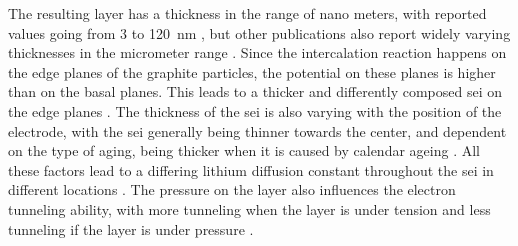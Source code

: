 The resulting layer has a thickness in the range of nano meters, with reported values going from 3 to \SI{120}{\nano\meter} \cite{An.2016,Bhattacharya.2012,Shinagawa.2017,Seidl.2016}, but other publications also report widely varying thicknesses in the micrometer range \cite{Bhattacharya.2012,Balagopal.2018}. Since the intercalation reaction happens on the edge planes of the graphite particles, the potential on these planes is higher than on the basal planes. This leads to a thicker and differently composed \gls{sei} on the edge planes \cite{Seidl.2016}. The thickness of the \gls{sei} is also varying with the position of the electrode, with the \gls{sei} generally being thinner towards the center, and dependent on the type of aging, being thicker when it is caused by calendar ageing \cite{Mussa.2019}. All these factors lead to a differing lithium diffusion constant throughout the \gls{sei} in different locations \cite{Bhattacharya.2012}. The pressure on the layer also influences the electron tunneling ability, with more tunneling when the layer is under tension and less tunneling if the layer is under pressure \cite{Lin.2016}. \par  
